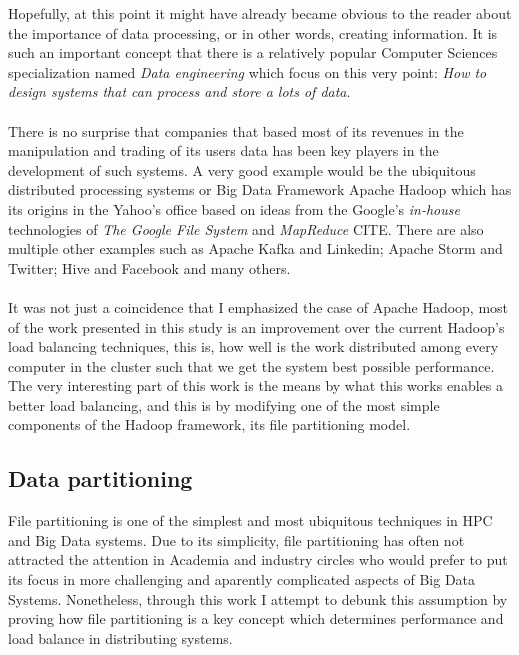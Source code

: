 Hopefully, at this point it might have already became obvious to the reader
about the importance of data processing, or in other words, creating
information. It is such an important concept that there is a relatively popular
Computer Sciences specialization named \textit{Data engineering} which focus on
this very point: \textit{How to design systems that can process and store a lots
of data}. \\ \\

There is no surprise that companies that based most of its revenues in the
manipulation and trading of its users data has been key players in the
development of such systems. A very good example would be the ubiquitous
distributed processing systems or Big Data Framework Apache Hadoop which has its
origins in the Yahoo's office based on ideas from the Google's \textit{in-house}
technologies of \textit{The Google File System} and \textit{MapReduce} CITE.
There are also multiple other examples such as Apache Kafka and Linkedin; Apache
Storm and Twitter; Hive and Facebook and many others. \\ \\

It was not just a coincidence that I emphasized the case of Apache Hadoop, most
of the work presented in this study is an improvement over the current Hadoop's
load balancing techniques, this is, how well is the work distributed among every
computer in the cluster such that we get the system best possible performance.
The very interesting part of this work is the means by what this works enables a
better load balancing, and this is by modifying one of the most simple
components of the Hadoop framework, its file partitioning model.

\subsection{Data partitioning}

File partitioning is one of the simplest and most ubiquitous techniques in HPC
and Big Data systems. Due to its simplicity, file partitioning has often
not attracted the attention in  Academia and industry circles who would prefer
to put its focus in more challenging and aparently complicated aspects of Big
Data Systems. Nonetheless, through this work I attempt to debunk this assumption
by proving how file partitioning is a key concept which determines performance and
load balance in distributing systems. \\ \\

